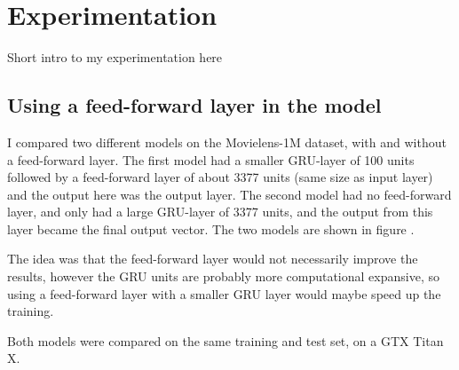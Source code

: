 \chapter{Experimentation}
Short intro to my experimentation here
\section{Using a feed-forward layer in the model}
I compared two different models on the Movielens-1M dataset, with and without a feed-forward layer. The first model had a smaller GRU-layer of 100 units followed by a feed-forward layer of about 3377 units (same size as input layer) and the output here was the output layer. The second model had no feed-forward layer, and only had a large GRU-layer of 3377 units, and the output from this layer became the final output vector. The two models are shown in figure . 

The idea was that the feed-forward layer would not necessarily improve the results, however the GRU units are probably more computational expansive, so using a feed-forward layer with a smaller GRU layer would maybe speed up the training.

Both models were compared on the same training and test set, on a GTX Titan X.

